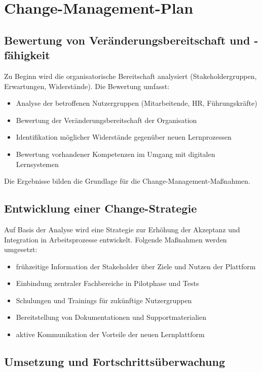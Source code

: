 \section{Change-Management-Plan}

\subsection{Bewertung von Veränderungsbereitschaft und -fähigkeit}

Zu Beginn wird die organisatorische Bereitschaft analysiert (Stakeholdergruppen, Erwartungen, Widerstände). Die Bewertung umfasst:

\begin{itemize}
    \item Analyse der betroffenen Nutzergruppen (Mitarbeitende, \ac{HR}, Führungskräfte)
    \item Bewertung der Veränderungsbereitschaft der Organisation
    \item Identifikation möglicher Widerstände gegenüber neuen Lernprozessen
    \item Bewertung vorhandener Kompetenzen im Umgang mit digitalen Lernsystemen
\end{itemize}

Die Ergebnisse bilden die Grundlage für die Change-Management-Maßnahmen.

\subsection{Entwicklung einer Change-Strategie}

Auf Basis der Analyse wird eine Strategie zur Erhöhung der Akzeptanz und Integration in Arbeitsprozesse entwickelt. Folgende Maßnahmen werden umgesetzt:

\begin{itemize}
    \item frühzeitige Information der Stakeholder über Ziele und Nutzen der Plattform
    \item Einbindung zentraler Fachbereiche in Pilotphase und Tests
    \item Schulungen und Trainings für zukünftige Nutzergruppen
    \item Bereitstellung von Dokumentationen und Supportmaterialien
    \item aktive Kommunikation der Vorteile der neuen Lernplattform
\end{itemize}

\subsection{Umsetzung und Fortschrittsüberwachung}

